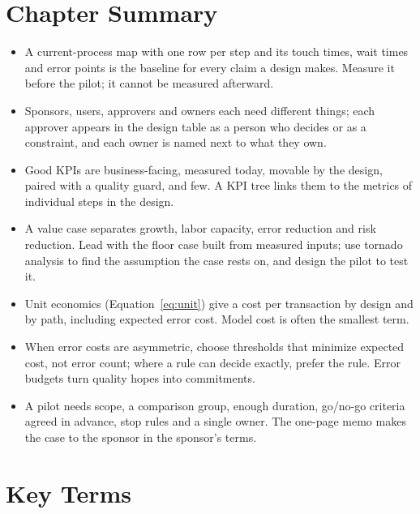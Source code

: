 \section*{Chapter Summary}

\begin{itemize}[itemsep=2pt]
  \item A current-process map with one row per step and its touch times, wait times and error points is the baseline for every claim a design makes. Measure it before the pilot; it cannot be measured afterward.
  \item Sponsors, users, approvers and owners each need different things; each approver appears in the design table as a person who decides or as a constraint, and each owner is named next to what they own.
  \item Good KPIs are business-facing, measured today, movable by the design, paired with a quality guard, and few. A KPI tree links them to the metrics of individual steps in the design.
  \item A value case separates growth, labor capacity, error reduction and risk reduction. Lead with the floor case built from measured inputs; use tornado analysis to find the assumption the case rests on, and design the pilot to test it.
  \item Unit economics (Equation~\ref{eq:unit}) give a cost per transaction by design and by path, including expected error cost. Model cost is often the smallest term.
  \item When error costs are asymmetric, choose thresholds that minimize expected cost, not error count; where a rule can decide exactly, prefer the rule. Error budgets turn quality hopes into commitments.
  \item A pilot needs scope, a comparison group, enough duration, go/no-go criteria agreed in advance, stop rules and a single owner. The one-page memo makes the case to the sponsor in the sponsor's terms.
\end{itemize}

\section*{Key Terms}

